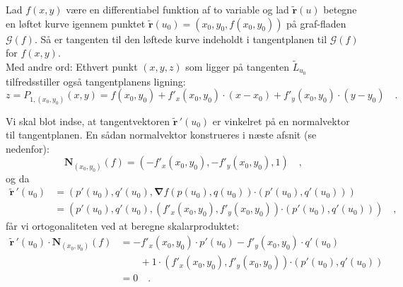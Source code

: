 \begin{theorem} \label{thmTangentTangent}
Lad $f(x,y)$ være en differentiabel funktion af to variable og lad $\widetilde{\mathbf{r}}(u)$ betegne en løftet kurve igennem punktet $\widetilde{\mathbf{r}}(u_{0}) = (x_{0}, y_{0}, f(x_{0}, y_{0}))$ på graf-fladen $\mathcal{G}(f)$. Så er tangenten til den løftede kurve indeholdt i tangentplanen til $\mathcal{G}(f)$ for $f(x,y)$. \\

Med andre ord: Ethvert punkt $(x,y,z)$ som ligger på tangenten $\widetilde{L}_{u_{0}}$ tilfredsstiller også tangentpla\-nens lig\-ning:
\begin{equation}
z = P_{1, (x_{0}, y_{0})}(x,y) = f(x_{0}, y_{0}) + f'_{x}(x_{0}, y_{0})\cdot (x - x_{0}) + f'_{y}(x_{0}, y_{0})\cdot (y - y_{0}) \quad.
\end{equation}
\end{theorem}

\begin{bevis}
Vi skal blot indse, at tangentvektoren $\widetilde{\mathbf{r}}\,'(u_{0})$ er vinkelret på en normalvektor til tangentplanen. En sådan normalvektor konstrueres i næste afsnit (se nedenfor):
\begin{equation}
\mathbf{N}_{(x_{0}, y_{0})}(f) = (- f'_{x}(x_{0}, y_{0}), -f'_{y}(x_{0}, y_{0}), 1 ) \quad ,
\end{equation}
og da
\begin{equation}
\begin{aligned}
\widetilde{\mathbf{r}}\,'(u_{0}) &=  \left(p'(u_{0}), q'(u_{0}), {\bm{\nabla}}f(p(u_{0}), q(u_{0}))\bm{\cdot} (p'(u_{0}), q'(u_{0})) \right) \\
&= \left(p'(u_{0}), q'(u_{0}), \left(f'_{x}(x_{0}, y_{0}), f'_{y}(x_{0}, y_{0})\right) \bm{\cdot} (p'(u_{0}), q'(u_{0}))\right)
\quad ,
\end{aligned}
\end{equation}
får vi ortogonaliteten ved at beregne skalarproduktet:
\begin{equation}
\begin{aligned}
\widetilde{\mathbf{r}}\,'(u_{0}) \, {\bm{\cdot}} \, \mathbf{N}_{(x_{0}, y_{0})}(f) & = - f'_{x}(x_{0}, y_{0})\cdot p'(u_{0})  -f'_{y}(x_{0}, y_{0})\cdot q'(u_{0}) \\ & \qquad + 1\cdot \left(f'_{x}(x_{0}, y_{0}), f'_{y}(x_{0}, y_{0})\right) \bm{\cdot} (p'(u_{0}), q'(u_{0})) \\
&= 0 \quad .
\end{aligned}
\end{equation}
\end{bevis}


